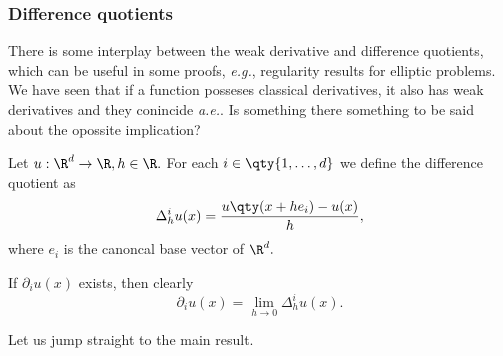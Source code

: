 \subsubsection{Difference quotients}
\label{sec:difference_quotients}

There is some interplay between the weak derivative and difference quotients, which can be useful in some proofs, \textit{e.g.}, regularity results for elliptic problems.
We have seen that if a function posseses classical derivatives, it also has weak derivatives and they conincide \textit{a.e.}. Is something there something to be said about the opossite implication?

\begin{definition}
    Let $u: \R^{d} \to \R, h \in \R.$ For each $i \in \qty{1, \dots, d}$ we define the difference quotient as
    \[
	    \Delta_{h}^i u(x) = \frac{u\qty(x+h e_i) - u(x)}{h},
    \]
    where $e_i$ is the canoncal base vector of $\R^{d}.$
\end{definition}

\begin{remark}
	If $\partial_{i}u(x)$ exists, then clearly
	\[
		\partial_{i}u(x) = \lim_{h\to 0}\Delta_h^i u(x).
	\]
\end{remark}

Let us jump straight to the main result.


